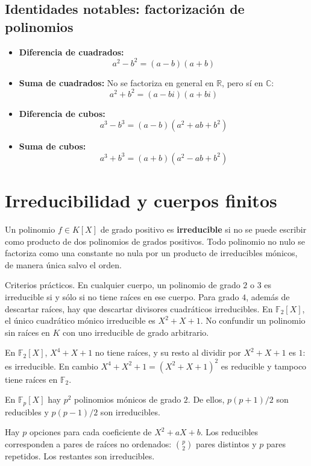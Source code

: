\subsection{Identidades notables: factorización de polinomios}
\begin{proposicion}
    \begin{itemize}
        \item \textbf{Diferencia de cuadrados:}
\[
            a^2-b^2=(a-b)(a+b)
\]
        \item \textbf{Suma de cuadrados:}
        No se factoriza en general en $\mathbb{R}$,
        pero sí en $\mathbb{C}$:
\[
            a^2+b^2=(a-bi)(a+bi)
\]
        \item \textbf{Diferencia de cubos:}
\[
            a^3-b^3=(a-b)(a^2+ab+b^2)
\]
        \item \textbf{Suma de cubos:}
\[
            a^3+b^3=(a+b)(a^2-ab+b^2)
\]
    \end{itemize}
\end{proposicion}
\section{Irreducibilidad y cuerpos finitos}
\begin{definicion}
Un polinomio $f\in K[X]$ de grado positivo es \textbf{irreducible}
si no se puede escribir como producto de dos polinomios de grados positivos.
Todo polinomio no nulo se factoriza como una constante no nula por
un producto de irreducibles mónicos, de manera única salvo el orden.
\end{definicion}
\begin{nota}{Criterios prácticos.}
En cualquier cuerpo, un polinomio de grado $2$ o $3$ es irreducible
si y sólo si no tiene raíces en ese cuerpo.
Para grado $4$, además de descartar raíces, hay que descartar divisores
cuadráticos irreducibles. En $\mathbb F_2[X]$, el único cuadrático
mónico irreducible es $X^2+X+1$.
No confundir un polinomio sin raíces en $K$ con uno irreducible de grado arbitrario.
\end{nota}
\begin{ejemplo}
En $\mathbb F_2[X]$, $X^4+X+1$ no tiene raíces, y su resto al dividir
por $X^2+X+1$ es $1$: es irreducible.
En cambio $X^4+X^2+1=(X^2+X+1)^2$ es reducible y tampoco tiene raíces en $\mathbb F_2$.
\end{ejemplo}
\begin{proposicion}[{title={Conteo de cuadráticos mónicos}}]
En $\mathbb F_p[X]$ hay $p^2$ polinomios mónicos de grado $2$.
De ellos, $p(p+1)/2$ son reducibles y $p(p-1)/2$ son irreducibles.
\end{proposicion}
\begin{demostracion}
Hay $p$ opciones para cada coeficiente de $X^2+aX+b$.
Los reducibles corresponden a pares de raíces no ordenados:
$\binom p2$ pares distintos y $p$ pares repetidos.
Los restantes son irreducibles.
\end{demostracion}
